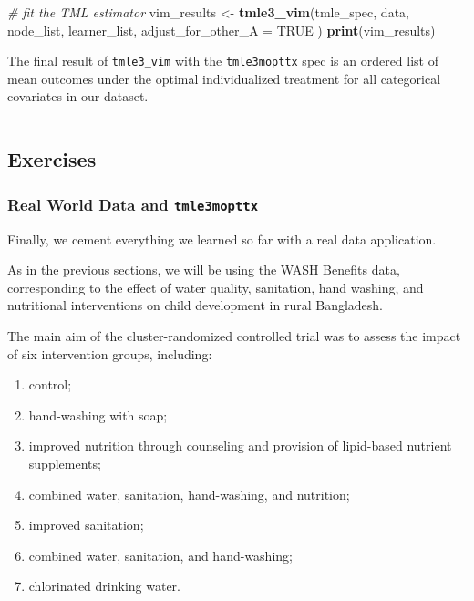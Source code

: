 \documentclass[12pt, krantz2,]{krantz}
\newenvironment{Shaded}{\begin{snugshade}}{\end{snugshade}}
\newcommand{\CommentTok}[1]{\textcolor[rgb]{0.37,0.37,0.37}{\textit{#1}}}
\newcommand{\DataTypeTok}[1]{\textcolor[rgb]{0.27,0.27,0.27}{#1}}
\newcommand{\KeywordTok}[1]{\textcolor[rgb]{0.27,0.27,0.27}{\textbf{#1}}}
\newcommand{\NormalTok}[1]{#1}
\newcommand{\OtherTok}[1]{\textcolor[rgb]{0.37,0.37,0.37}{#1}}
\newcommand{\StringTok}[1]{\textcolor[rgb]{0.5,0.5,0.5}{#1}}
\theoremstyle{definition}
\theoremstyle{definition}
\theoremstyle{definition}
\newcommand{\1}{\mathbbm{1}}
\begin{document}
\begin{Shaded}
\begin{Highlighting}[]
\CommentTok{# fit the TML estimator}
\NormalTok{vim_results <-}\StringTok{ }\KeywordTok{tmle3_vim}\NormalTok{(tmle_spec, data, node_list, learner_list,}
  \DataTypeTok{adjust_for_other_A =} \OtherTok{TRUE}
\NormalTok{)}
\KeywordTok{print}\NormalTok{(vim_results)}
\end{Highlighting}
\end{Shaded}

The final result of \texttt{tmle3\_vim} with the \texttt{tmle3mopttx} spec is an ordered list
of mean outcomes under the optimal individualized treatment for all categorical
covariates in our dataset.

\begin{center}\rule{0.5\linewidth}{0.5pt}\end{center}

\hypertarget{exercises-2}{%
\subsection{Exercises}\label{exercises-2}}

\hypertarget{real-world-data-and-tmle3mopttx}{%
\subsubsection{\texorpdfstring{Real World Data and \texttt{tmle3mopttx}}{Real World Data and tmle3mopttx}}\label{real-world-data-and-tmle3mopttx}}

Finally, we cement everything we learned so far with a real data application.

As in the previous sections, we will be using the WASH Benefits data,
corresponding to the effect of water quality, sanitation, hand washing, and
nutritional interventions on child development in rural Bangladesh.

The main aim of the cluster-randomized controlled trial was to assess the
impact of six intervention groups, including:

\begin{enumerate}
\def\labelenumi{\arabic{enumi}.}
\item
  control;
\item
  hand-washing with soap;
\item
  improved nutrition through counseling and provision of lipid-based nutrient
  supplements;
\item
  combined water, sanitation, hand-washing, and nutrition;
\item
  improved sanitation;
\item
  combined water, sanitation, and hand-washing;
\item
  chlorinated drinking water.
\end{enumerate}
\end{document}
